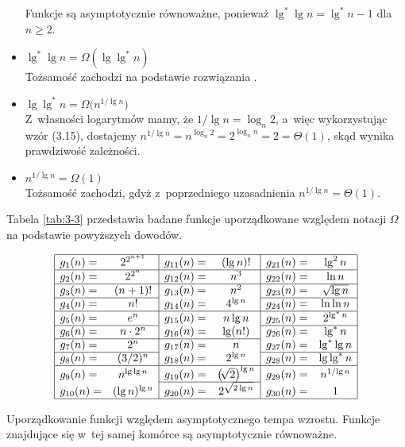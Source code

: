 \begin{itemize}
	Funkcje są asymptotycznie równoważne, ponieważ $\lg^*\lg n=\lg^*n-1$ dla $n\ge2$.
\item $\lg^*\lg n=\Omega(\lg\lg^*n)$ \\
	Tożsamość zachodzi na podstawie rozwiązania .
\item $\lg\lg^*n=\Omega\bigl(n^{1/\!\lg n}\bigr)$ \\
	Z~własności logarytmów mamy, że $1/\!\lg n=\log_n2$, a~więc wykorzystując wzór (3.15), dostajemy $n^{1/\!\lg n}=n^{\log_n2}=2^{\log_nn}=2=\Theta(1)$, skąd wynika prawdziwość zależności.
\item $n^{1/\!\lg n}=\Omega(1)$ \\
	Tożsamość zachodzi, gdyż z~poprzedniego uzasadnienia $n^{1/\!\lg n}=\Theta(1)$.
\end{itemize}

Tabela \ref{tab:3-3} przedstawia badane funkcje uporządkowane względem notacji $\Omega$ na podstawie powyższych dowodów.
\begin{table}[ht]
	\centering
		\[
			\begin{array}{|lc|lc|lc|} \hline
				g_1(n)= & 2^{2^{n+1}} & g_{11}(n)= & (\lg n)! & g_{21}(n)= & \lg^2n \\ \hline
				g_2(n)= & 2^{2^n} & g_{12}(n)= & n^3 & g_{22}(n)= & \ln n \\ \hline
				g_3(n)= & (n+1)! & g_{13}(n)= & n^2 & g_{23}(n)= & \sqrt{\lg n} \\ \cline{1-2}\cline{5-6}
				g_4(n)= & n! & g_{14}(n)= & 4^{\lg n} & g_{24}(n)= & \ln\ln n \\ \hline
				g_5(n)= & e^n & g_{15}(n)= & n\lg n & g_{25}(n)= & 2^{\lg^*n} \\ \cline{1-2}\cline{5-6}
				g_6(n)= & n\cdot2^n & g_{16}(n)= & \lg(n!) & g_{26}(n)= & \lg^*n \\ \cline{1-4}
				g_7(n)= & 2^n & g_{17}(n)= & n & g_{27}(n)= & \lg^*\lg n \\ \cline{1-2}\cline{5-6}
				g_8(n)= & (3/2)^n & g_{18}(n)= & 2^{\lg n} & g_{28}(n)= & \lg\lg^*n \\ \hline
				g_9(n)= & n^{\lg\lg n} & g_{19}(n)= & \bigl(\!\sqrt{2}\bigr)^{\lg n} & g_{29}(n)= & n^{1/\!\lg n} \\ \cline{3-4}
				g_{10}(n)= & (\lg n)^{\lg n} & g_{20}(n)= & 2^{\sqrt{2\lg n}} & g_{30}(n)= & 1 \\ \hline
			\end{array}
		\]
	\caption{Uporządkowanie funkcji względem asymptotycznego tempa wzrostu.
Funkcje znajdujące się w~tej samej komórce są asymptotycznie równoważne.} \label{tab:3-3}
\end{table}

